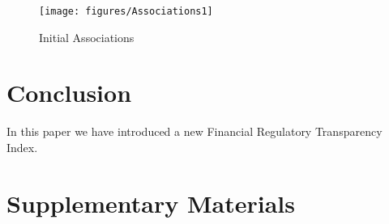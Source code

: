 \documentclass[a4paper]{article}
\begin{document}
\begin{figure}
    \caption{Initial Associations}
    \label{basicAssoc}
    \begin{center}
        \texttt{[image: figures/Associations1]}
    \end{center}
\end{figure}

\section*{Conclusion}

In this paper we have introduced a new Financial Regulatory Transparency Index.





\section*{Supplementary Materials}

\end{document}
